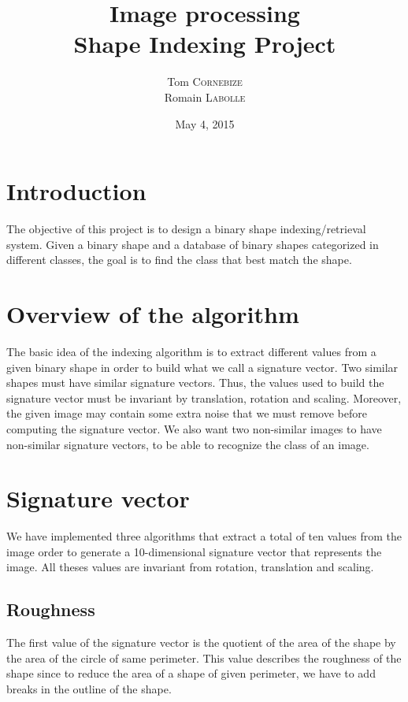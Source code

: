 \documentclass[a4paper,12pt]{article}
\title{Image processing\\Shape Indexing Project}
\author{Tom \textsc{Cornebize}\\Romain \textsc{Labolle}}
\date{May 4, 2015}
\theoremstyle{example}
\theoremstyle{remark}
\theoremstyle{definition}
\begin{document}
\maketitle

\pagestyle{fancy}

\section{Introduction}

The objective of this project is to design a binary shape indexing/retrieval system. Given a binary shape and a database of binary shapes categorized in different classes, the goal is to find the class that best match the shape.

\section{Overview of the algorithm}

The basic idea of the indexing algorithm is to extract different values from a given binary shape in order to build what we call a signature vector. Two similar shapes must have similar signature vectors. Thus, the values used to build the signature vector must be invariant by translation, rotation and scaling. Moreover, the given image may contain some extra noise that we must remove before computing the signature vector. We also want two non-similar images to have non-similar signature vectors, to be able to recognize the class of an image.

\section{Signature vector}

We have implemented three algorithms that extract a total of ten values from the image order to generate a 10-dimensional signature vector that represents the image. All theses values are invariant from rotation, translation and scaling.

\subsection{Roughness}

The first value of the signature vector is the quotient of the area of the shape by the area of the circle of same perimeter. This value describes the roughness of the shape since to reduce the area of a shape of given perimeter, we have to add breaks in the outline of the shape.
\end{document}
